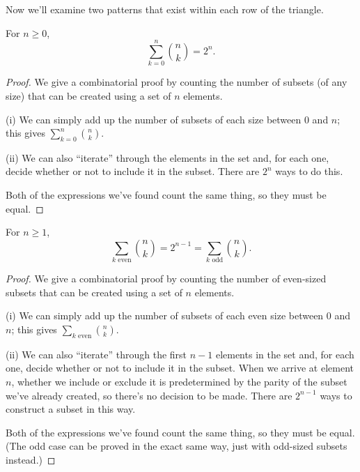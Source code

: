 \documentclass[../m055main.tex]{subfiles}
\begin{document}
Now we'll examine two patterns that exist within each row of the triangle.

\begin{theorem} \label{rowSums}
    For $n \geq 0$,
    \[ \sum_{k=0}^{n} \binom{n}{k} = 2^{n}. \]
\end{theorem}

\begin{proof}
    We give a combinatorial proof by counting the number of subsets (of any size) that can be created using a set of $n$ elements.
    \smallskip

    (i) We can simply add up the number of subsets of each size between 0 and $n$; this gives $\sum\limits_{k=0}^{n} \binom{n}{k}$.
    \vspace{-3pt}

    (ii) We can also ``iterate'' through the elements in the set and, for each one, decide whether or not to include it in the subset.
    There are $2^{n}$ ways to do this.
    \smallskip

    Both of the expressions we've found count the same thing, so they must be equal.
\end{proof}

\pagebreak

\begin{theorem} \label{parityRowSums}
    For $n \geq 1$,
    \[ \sum_{k\textrm{ even}} \binom{n}{k} = 2^{n-1} = \sum_{k\textrm{ odd}} \binom{n}{k}. \]
\end{theorem}

\begin{proof}
    We give a combinatorial proof by counting the number of even-sized subsets that can be created using a set of $n$ elements.
    \smallskip

    (i) We can simply add up the number of subsets of each even size between 0 and $n$; this gives $\sum\limits_{k\textrm{ even}} \binom{n}{k}$.
    \vspace{-10pt}

    (ii) We can also ``iterate'' through the first $n-1$ elements in the set and, for each one, decide whether or not to include it in the subset.
    When we arrive at element $n$, whether we include or exclude it is predetermined by the parity of the subset we've already created, so there's no decision to be made.
    There are $2^{n-1}$ ways to construct a subset in this way.
    \smallskip

    Both of the expressions we've found count the same thing, so they must be equal.
    (The odd case can be proved in the exact same way, just with odd-sized subsets instead.)
\end{proof}
\end{document}

